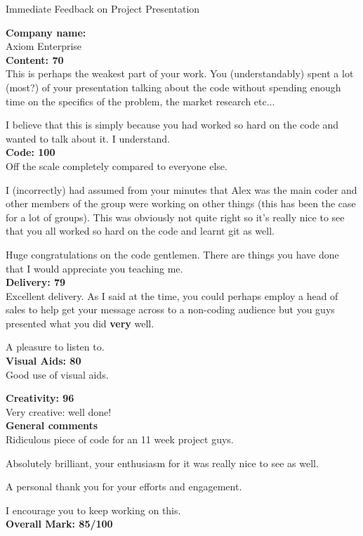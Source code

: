 \documentclass{article}
\begin{document}
\begin{center}
\Huge{Immediate Feedback on Project Presentation}\\
\end{center}


\normalsize
\textbf{Company name:}\\

Axiom Enterprise \\

\textbf{Content: 70}\\

This is perhaps the weakest part of your work.
You (understandably) spent a lot (most?) of your presentation talking about the code without spending enough time on the specifics of the problem, the market research etc...

I believe that this is simply because you had worked so hard on the code and wanted to talk about it.
I understand.\\

\textbf{Code: 100}\\

Off the scale completely compared to everyone else.

I (incorrectly) had assumed from your minutes that Alex was the main coder and other members of the group were working on other things (this has been the case for a lot of groups).
This was obviously not quite right so it's really nice to see that you all worked so hard on the code and learnt git as well.

Huge congratulations on the code gentlemen.
There are things you have done that I would appreciate you teaching me.\\

\textbf{Delivery: 79}\\

Excellent delivery.
As I said at the time, you could perhaps employ a head of sales to help get your message across to a non-coding audience but you guys presented what you did \textbf{very} well.

A pleasure to listen to.\\

\textbf{Visual Aids: 80}\\

Good use of visual aids.

\textbf{Creativity: 96}\\

Very creative: well done!\\


\textbf{General comments}\\

Ridiculous piece of code for an 11 week project guys.

Absolutely brilliant, your enthusiasm for it was really nice to see as well.

A personal thank you for your efforts and engagement.

I encourage you to keep working on this.\\

\textbf{Overall Mark: 85/100}
\end{document}
